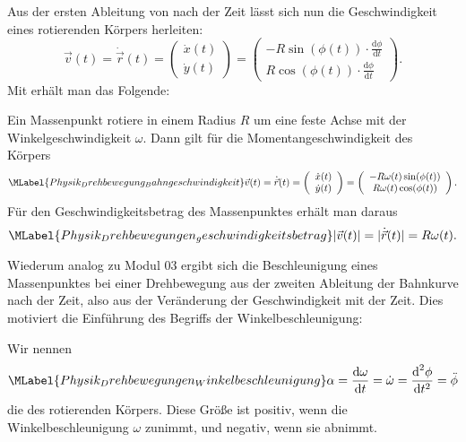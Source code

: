 \begin{MContent}
Aus der ersten Ableitung von  nach der Zeit l\"asst sich nun die Geschwindigkeit eines rotierenden K\"orpers herleiten:
\begin{equation*}
\vec{v}(t)=\dot{\vec{r}}(t)=\left(\begin{array}{c} \dot{x}(t) \\ \dot{y}(t) \end{array}\right)=\left(\begin{array}{c} -R\sin(\phi(t))\cdot\frac{\text{d}\phi}{\text{d}t} \\ R\cos(\phi(t))\cdot\frac{\text{d}\phi}{\text{d}t} \end{array}\right).
\end{equation*}
Mit  erh\"alt man das Folgende:
\begin{MInfo}
Ein Massenpunkt rotiere in einem Radius $R$ um eine feste Achse mit der Winkelgeschwindigkeit $\omega$. Dann gilt f\"ur die Momentangeschwindigkeit des K\"orpers
\begin{equation}\MLabel{Physik_Drehbewegung_Bahngeschwindigkeit}
\vec{v}(t)=\dot{\vec{r}}(t)=\left(\begin{array}{c} \dot{x}(t) \\ \dot{y}(t) \end{array}\right)=\left(\begin{array}{c} -R\omega(t)\sin(\phi(t)) \\ R\omega(t)\cos(\phi(t)) \end{array}\right).\\
\end{equation}
F\"ur den Geschwindigkeitsbetrag des Massenpunktes erh\"alt man daraus
\begin{equation}\MLabel{Physik_Drehbewegungen_geschwindigkeitsbetrag}
\vert\vec{v}(t)\vert=\vert\dot{\vec{r}}(t)\vert=R\omega(t).
\end{equation}
\end{MInfo}

Wiederum analog zu Modul 03 ergibt sich die Beschleunigung eines Massenpunktes bei einer Drehbewegung aus der zweiten Ableitung der Bahnkurve nach der Zeit, also aus der Ver\"anderung der Geschwindigkeit mit der Zeit. Dies motiviert die Einf\"uhrung des Begriffs der Winkelbeschleunigung:

\begin{MInfo}
Wir nennen
\begin{equation}\MLabel{Physik_Drehbewegungen_Winkelbeschleunigung}
\alpha=\frac{\textrm{d}\omega}{\textrm{d}t}=\dot{\omega}=\frac{\textrm{d}^2\phi}{\textrm{d}t^2}=\ddot{\phi}
\end{equation}die  des rotierenden K\"orpers. Diese Gr\"o{\ss}e ist positiv, wenn die Winkelbeschleunigung $\omega$ zunimmt, und negativ, wenn sie abnimmt.\\


\end{MInfo}
\end{MContent}

